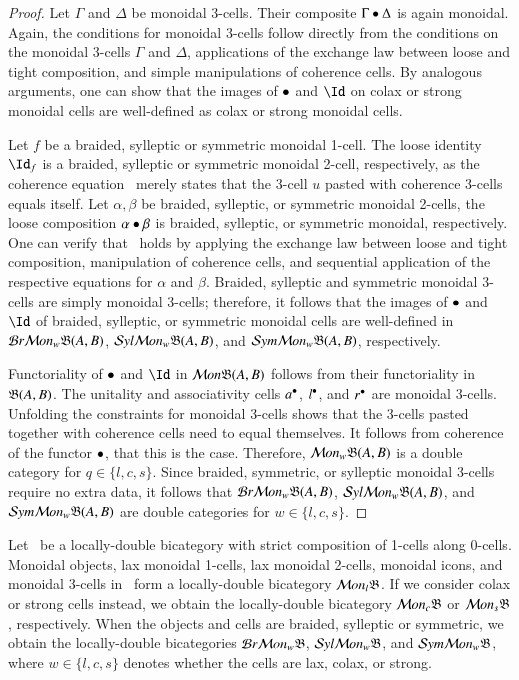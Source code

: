 \begin{proof}
Let $\Gamma$ and $\Delta$ be monoidal 3-cells. Their composite $\Gamma \bullet \Delta$ is again monoidal. Again, the conditions for monoidal 3-cells follow directly from the conditions on the monoidal 3-cells $\Gamma$ and $\Delta$, applications of the exchange law between loose and tight composition, and simple manipulations of coherence cells.
By analogous arguments, one can show that the images of $\bullet$ and $\looseid$ on colax or strong monoidal cells are well-defined as colax or strong monoidal cells. 

Let $f$ be a braided, sylleptic or symmetric monoidal 1-cell. The loose identity $\looseid_f$ is a braided, sylleptic or symmetric monoidal 2-cell, respectively, as the coherence equation~\cite[(BTA1) p143]{mccrudden:bal-coalgb} merely states that the 3-cell $u$ pasted with coherence 3-cells equals itself. Let $\alpha, \beta$ be braided, sylleptic, or symmetric monoidal 2-cells, the loose composition $\alpha \bullet \beta$ is braided, sylleptic, or symmetric monoidal, respectively. One can verify that~\cite[(BTA1) p143]{mccrudden:bal-coalgb} holds by applying the exchange law between loose and tight composition, manipulation of coherence cells, and sequential application of the respective equations for $\alpha$ and $\beta$.  Braided, sylleptic and symmetric monoidal 3-cells are simply monoidal 3-cells; therefore, it follows that the images of $\bullet$ and $\looseid$ of braided, sylleptic, or symmetric monoidal cells are well-defined in $\mathcal{B} r \mathcal{M} on_w\mathfrak{B}(A,B)$, $\mathcal{S} yl \mathcal{M} on_w\mathfrak{B}(A,B)$, and $\mathcal{S} ym \mathcal{M} on_w\mathfrak{B}(A,B)$, respectively.

Functoriality of $\bullet$ and $\looseid$ in $\mathcal{M} on \mathfrak{B}(A,B)$ follows from their functoriality in $\mathfrak{B}(A,B)$. 
The unitality and associativity cells $a^{\bullet}$, $l^{\bullet}$, and $r^{\bullet}$ are monoidal 3-cells. Unfolding the constraints for monoidal 3-cells shows that the 3-cells pasted together with coherence cells need to equal themselves. It follows from coherence of the functor $\bullet$, that this is the case. Therefore,  $\mathcal{M} on_w\mathfrak{B}(A,B)$ is a double category for $q \in \{l,c,s\}$. 
Since braided, symmetric, or sylleptic monoidal 3-cells require no extra data, it follows that $\mathcal{B} r \mathcal{M} on_w\mathfrak{B}(A,B)$, $\mathcal{S} yl \mathcal{M} on_w\mathfrak{B}(A,B)$, and $\mathcal{S} ym \mathcal{M} on_w\mathfrak{B}(A,B)$ are double categories for $w \in \{l,c,s\}$.
\end{proof}

\begin{thm}\label{thm:lcbc}
Let \fB\ be a locally-double bicategory with strict composition of 1-cells along 0-cells. Monoidal objects, lax monoidal 1-cells, lax monoidal 2-cells, monoidal icons, and monoidal 3-cells in  \fB\ form a locally-double bicategory $\mathcal{M} on_l\mathfrak{B}$. 
  If we consider colax or strong cells instead, we obtain the locally-double bicategory $\mathcal{M} on_c\mathfrak{B}$ or $\mathcal{M} on_s\mathfrak{B}$, respectively. When the objects and cells are braided, sylleptic or symmetric,  we obtain the locally-double bicategories $\mathcal{B} r \mathcal{M} on_w\mathfrak{B}$, $\mathcal{S} yl \mathcal{M} on_w\mathfrak{B}$, and $\mathcal{S} ym \mathcal{M} on_w\mathfrak{B}$, where $w \in \{l,c,s\}$ denotes whether the cells are lax, colax, or strong.
\end{thm}


